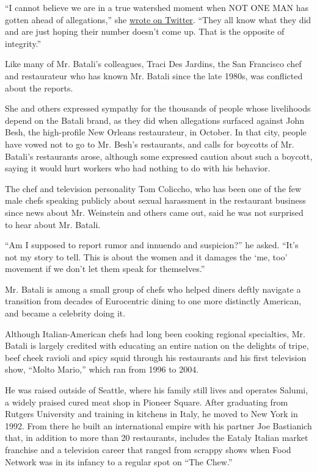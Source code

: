 ``I cannot believe we are in a true watershed moment when NOT ONE MAN
has gotten ahead of allegations,'' she
\href{https://twitter.com/tiffanifaison/status/940249384926744576}{wrote
on Twitter}. ``They all know what they did and are just hoping their
number doesn't come up. That is the opposite of integrity.''

Like many of Mr. Batali's colleagues, Traci Des Jardins, the San
Francisco chef and restaurateur who has known Mr. Batali since the late
1980s, was conflicted about the reports.

She and others expressed sympathy for the thousands of people whose
livelihoods depend on the Batali brand, as they did when allegations
surfaced against John Besh, the high-profile New Orleans restaurateur,
in October. In that city, people have vowed not to go to Mr. Besh's
restaurants, and calls for boycotts of Mr. Batali's restaurants arose,
although some expressed caution about such a boycott, saying it would
hurt workers who had nothing to do with his behavior.

The chef and television personality Tom Coliccho, who has been one of
the few male chefs speaking publicly about sexual harassment in the
restaurant business since news about Mr. Weinstein and others came out,
said he was not surprised to hear about Mr. Batali.

``Am I supposed to report rumor and innuendo and suspicion?'' he asked.
``It's not my story to tell. This is about the women and it damages the
`me, too' movement if we don't let them speak for themselves.''

Mr. Batali is among a small group of chefs who helped diners deftly
navigate a transition from decades of Eurocentric dining to one more
distinctly American, and became a celebrity doing it.

Although Italian-American chefs had long been cooking regional
specialties, Mr. Batali is largely credited with educating an entire
nation on the delights of tripe, beef cheek ravioli and spicy squid
through his restaurants and his first television show, ``Molto Mario,''
which ran from 1996 to 2004.

He was raised outside of Seattle, where his family still lives and
operates Salumi, a widely praised cured meat shop in Pioneer Square.
After graduating from Rutgers University and training in kitchens in
Italy, he moved to New York in 1992. From there he built an
international empire with his partner Joe Bastianich that, in addition
to more than 20 restaurants, includes the Eataly Italian market
franchise and a television career that ranged from scrappy shows when
Food Network was in its infancy to a regular spot on ``The Chew.''

